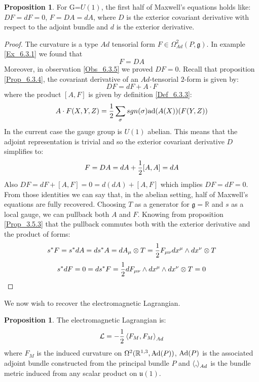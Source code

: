 \documentclass[12pt,a4paper]{report}
\theoremstyle{definition}
\theoremstyle{Theorem}
\newtheorem{Prop}[Def]{Proposition}
\theoremstyle{definition}
\theoremstyle{definition}
\begin{document}
	\begin{Prop}\label{Prop_8.4.3}
		For G=$U(1)$, the first half of Maxwell's equations holds like: $DF=dF=0$, $F=DA=dA$, where $D$ is the exterior covariant derivative with respect to the adjoint bundle and $d$ is the exterior derivative.
	\end{Prop}
	\begin{proof}
		The curvature is a type $Ad$ tensorial form $F\in \Omega^2_{Ad}(P,\mathfrak{g})$. In example \ref{Ex_6.3.1} we found that
		$$F=DA$$
		Moreover, in observation \ref{Obs_6.3.5} we proved $DF=0$. Recall that proposition \ref{Prop_6.3.4}, the covariant derivative of an $Ad$-tensorial $2$-form is given by:
		$$DF=dF+A\cdot F$$
		where the product $[A,F]$ is given by definition \ref{Def_6.3.3}:
		$$A\cdot F(X,Y,Z)={1\over 2}\sum_\sigma sgn(\sigma)\hbox{ad}(A(X))(F(Y,Z))$$
		In the current case the gauge group is $U(1)$ abelian. This means that the adjoint representation is trivial and so the exterior covariant derivative $D$ simplifies to:
		$$F=DA=dA+{1\over 2}[A,A]=dA$$
		Also $DF=dF+[A,F]=0=d(dA)+[A,F]$ which implies $DF=dF=0$. From those identities we can say that, in the abelian setting, half of Maxwell's equations are fully recovered. Choosing $T$ as a generator for $\mathfrak{g}=\mathbb{R}$ and $s$ as a local gauge, we can pullback both $A$ and $F$. Knowing from proposition \ref{Prop_3.5.3} that the pullback commutes both with the exterior derivative and the product of forms:
		$$s^*F=s^*dA=ds^*A=dA_\mu\otimes T={1\over 2}F_{\mu\nu} dx^\mu\wedge dx^\nu \otimes T$$
		$$s^*dF=0=ds^*F={1\over 2}dF_{\mu\nu}\wedge dx^\mu\wedge dx^\nu \otimes T=0$$
	\end{proof}
	We now wish to recover the electromagnetic Lagrangian.
	\begin{Prop}
		The electromagnetic Lagrangian is:
		$$\mathcal{L}=-{1\over 2}\braket{F_M,F_M}_{Ad}$$
		where $F_M$ is the induced curvature on $\Omega^2(\mathbb{R}^{1,3},\hbox{Ad}(P))$, $\hbox{Ad}(P)$ is the associated adjoint bundle constructed from the principal bundle $P$ and $\braket{,}_{Ad}$ is the bundle metric induced from any scalar product on $\mathfrak{u}(1)$.
	\end{Prop}
\end{document}
